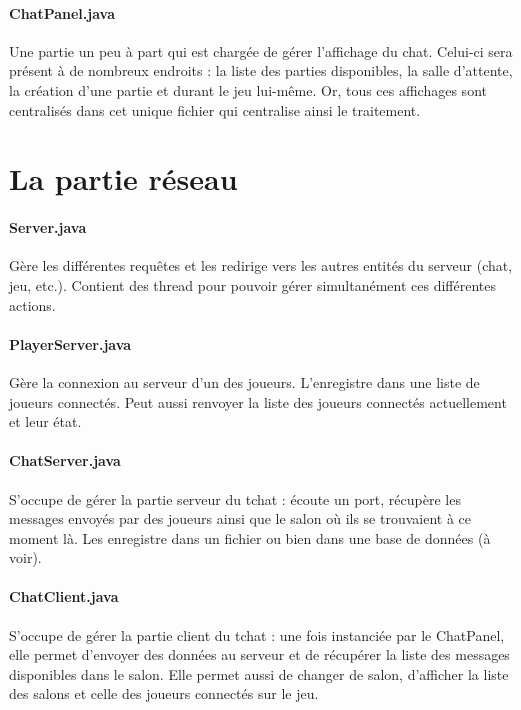 \documentclass[a4paper,12pt]{report}
\begin{document}
\paragraph{ChatPanel.java}
Une partie un peu à part qui est chargée de gérer l'affichage du chat. Celui-ci sera présent à de nombreux endroits : la liste des parties disponibles, la salle d'attente, la création d'une partie et durant le jeu lui-même. Or, tous ces affichages sont centralisés dans cet unique fichier qui centralise ainsi le traitement.


\section{La partie réseau}
\paragraph{Server.java}
Gère les différentes requêtes et les redirige vers les autres entités du serveur (chat, jeu, etc.). Contient des thread pour pouvoir gérer simultanément ces différentes actions.
\paragraph{PlayerServer.java}
Gère la connexion au serveur d'un des joueurs. L'enregistre dans une liste de joueurs connectés. Peut aussi renvoyer la liste des joueurs connectés actuellement et leur état.
\paragraph{ChatServer.java}
S'occupe de gérer la partie serveur du tchat : écoute un port, récupère les messages envoyés par des joueurs ainsi que le salon où ils se trouvaient à ce moment là. Les enregistre dans un fichier ou bien dans une base de données (à voir).
\paragraph{ChatClient.java}
S'occupe de gérer la partie client du tchat : une fois instanciée par le ChatPanel, elle permet d'envoyer des données au serveur et de récupérer la liste des messages disponibles dans le salon. Elle permet aussi de changer de salon, d'afficher la liste des salons et celle des joueurs connectés sur le jeu.

\end{document}
